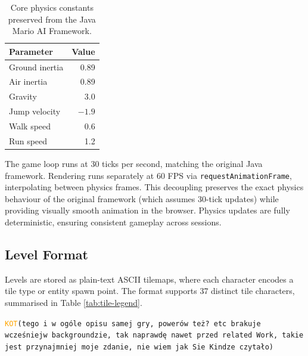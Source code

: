 \documentclass[shortabstract, mgr, english]{iithesis}
\newcommand{\DEBUG}[1]{{#1}} %
\newcommand{\KOT}[1]{\DEBUG{\tt{\textcolor{orange}{KOT}(}{#1}{)}}}
\begin{document}
\begin{table}[H]
\centering
\begin{tabular}{lr}
\toprule
\textbf{Parameter} & \textbf{Value} \\
\midrule
Ground inertia & 0.89 \\
Air inertia    & 0.89 \\
Gravity        & 3.0 \\
Jump velocity  & $-1.9$ \\
Walk speed     & 0.6 \\
Run speed      & 1.2 \\
\bottomrule
\end{tabular}
\caption{Core physics constants preserved from the Java Mario AI Framework.}
\label{tab:physics}
\end{table}

The game loop runs at 30 ticks per second, matching the original Java framework.
Rendering runs separately at 60 FPS via \texttt{requestAnimationFrame}, interpolating
between physics frames. This decoupling preserves the exact physics behaviour of the
original framework (which assumes 30-tick updates) while providing visually smooth
animation in the browser. Physics updates are fully deterministic, ensuring consistent
gameplay across sessions.

\subsection{Level Format}
\label{subsec:sd-level-format}

Levels are stored as plain-text ASCII tilemaps, where each character encodes a tile type
or entity spawn point. The format supports 37 distinct tile characters, summarised in
Table \ref{tab:tile-legend}.

\KOT{tego i w ogóle opisu samej gry, powerów też? etc brakuje wcześniejw  backgroundzie, tak naprawdę nawet przed related Work, takie jest przynajmniej moje zdanie, nie wiem jak Sie Kindze czytało}
\end{document}
